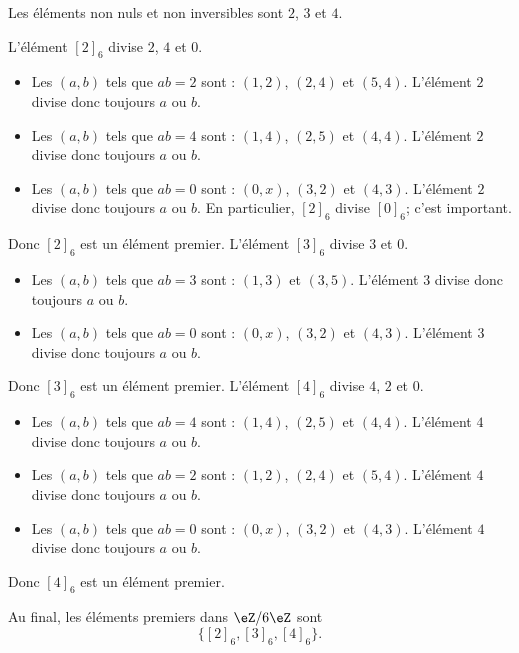 \begin{normaltext}       \label{NORMooAXOKooAQMXoB}
	Les éléments non nuls et non inversibles sont \( 2\), \( 3\) et \( 4\).
	\begin{subproof}
		\spitem[Pour \( 2\)]
		L'élément \( [2]_6\) divise \( 2\), \( 4\) et \( 0\).
		\begin{itemize}
			\item Les \( (a,b)\) tels que \( ab=2\) sont : \( (1,2)\), \( (2,4)\) et \( (5,4)\). L'élément \( 2\) divise donc toujours \( a\) ou \( b\).
			\item Les \( (a,b)\) tels que \( ab=4\) sont : \( (1,4)\), \( (2,5)\) et \( (4,4)\). L'élément \( 2\) divise donc toujours \( a\) ou \( b\).
			\item Les \( (a,b)\) tels que \( ab=0\) sont : \( (0,x)\), \( (3,2)\) et \( (4,3)\). L'élément \( 2\) divise donc toujours \( a\) ou \( b\). En particulier, \( [2]_6\) divise \( [0]_6\); c'est important.
		\end{itemize}
		Donc \( [2]_6\) est un élément premier.
		\spitem[Pour \( 3\)]
		L'élément \( [3]_6\) divise \( 3\) et \( 0\).
		\begin{itemize}
			\item Les \( (a,b)\) tels que \( ab=3\) sont : \( (1,3)\) et \( (3,5)\).             L'élément \( 3\) divise donc toujours \( a\) ou \( b\).
			\item Les \( (a,b)\) tels que \( ab=0\) sont : \( (0,x)\), \( (3,2)\) et \( (4,3)\). L'élément \( 3\) divise donc toujours \( a\) ou \( b\).
		\end{itemize}
		Donc \( [3]_6\) est un élément premier.
		L'élément \( [4]_6\) divise \( 4\), \( 2\) et \( 0\).
		\begin{itemize}
			\item Les \( (a,b)\) tels que \( ab=4\) sont : \( (1,4)\), \( (2,5)\) et \( (4,4)\). L'élément \( 4\) divise donc toujours \( a\) ou \( b\).
			\item Les \( (a,b)\) tels que \( ab=2\) sont : \( (1,2)\), \( (2,4)\) et \( (5,4)\). L'élément \( 4\) divise donc toujours \( a\) ou \( b\).
			\item Les \( (a,b)\) tels que \( ab=0\) sont : \( (0,x)\), \( (3,2)\) et \( (4,3)\). L'élément \( 4\) divise donc toujours \( a\) ou \( b\).
		\end{itemize}
		Donc \( [4]_6\) est un élément premier.
	\end{subproof}
	Au final, les éléments premiers dans \( \eZ/6\eZ\) sont
	\begin{equation}
		\big\{ [2]_6, [3]_6, [4]_6  \big\}.
	\end{equation}
\end{normaltext}

